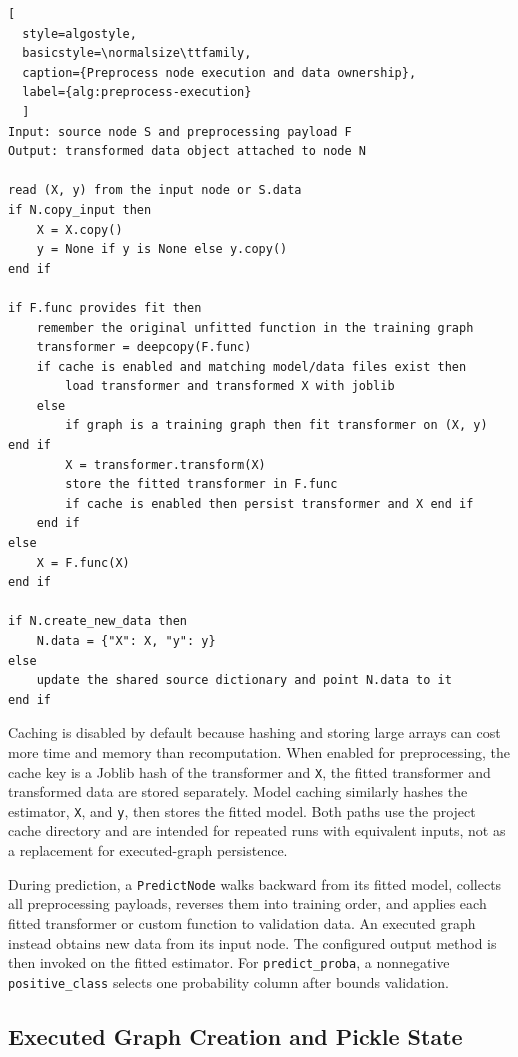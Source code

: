 \documentclass[12pt,a4paper,oneside]{report}
\begin{document}
\noindent\begin{minipage}{\textwidth}
\begin{lstlisting}[
  style=algostyle,
  basicstyle=\normalsize\ttfamily,
  caption={Preprocess node execution and data ownership},
  label={alg:preprocess-execution}
  ]
Input: source node S and preprocessing payload F
Output: transformed data object attached to node N

read (X, y) from the input node or S.data
if N.copy_input then
    X = X.copy()
    y = None if y is None else y.copy()
end if

if F.func provides fit then
    remember the original unfitted function in the training graph
    transformer = deepcopy(F.func)
    if cache is enabled and matching model/data files exist then
        load transformer and transformed X with joblib
    else
        if graph is a training graph then fit transformer on (X, y) end if
        X = transformer.transform(X)
        store the fitted transformer in F.func
        if cache is enabled then persist transformer and X end if
    end if
else
    X = F.func(X)
end if

if N.create_new_data then
    N.data = {"X": X, "y": y}
else
    update the shared source dictionary and point N.data to it
end if
\end{lstlisting}
\end{minipage}

Caching is disabled by default because hashing and storing large arrays can cost
more time and memory than recomputation. When enabled for preprocessing, the
cache key is a Joblib hash of the transformer and \texttt{X}, the fitted
transformer and transformed data are stored separately. Model caching similarly
hashes the estimator, \texttt{X}, and \texttt{y}, then stores the fitted model.
Both paths use the project cache directory and are intended for repeated runs
with equivalent inputs, not as a replacement for executed-graph persistence.

During prediction, a \texttt{PredictNode} walks backward from its fitted model,
collects all preprocessing payloads, reverses them into training order, and
applies each fitted transformer or custom function to validation data. An
executed graph instead obtains new data from its input node. The configured
output method is then invoked on the fitted estimator. For
\texttt{predict\_proba}, a nonnegative \texttt{positive\_class} selects one
probability column after bounds validation.

\subsection{Executed Graph Creation and Pickle State}
\end{document}
